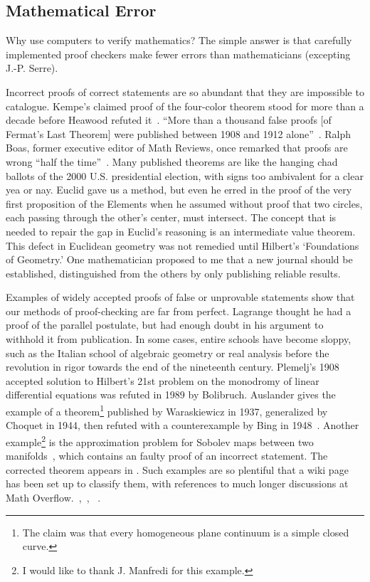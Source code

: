 \documentclass{llncs}
\begin{document}
\subsection{Mathematical Error}

Why use computers to verify mathematics?  The simple answer is that
carefully implemented proof checkers make fewer errors than 
mathematicians (excepting J.-P. Serre).

Incorrect proofs of correct statements are so abundant that they are
impossible to catalogue.  Kempe's claimed proof of the four-color
theorem stood for more than a decade before Heawood refuted
it~\cite[p.~115]{Mac}.  ``More than a thousand false proofs [of
Fermat's Last Theorem] were published between 1908 and 1912
alone''~\cite{Corry}.  Ralph Boas, former executive editor of Math
Reviews, once remarked that proofs are wrong ``half the
time''~\cite{Aus}.  Many published theorems are like the hanging chad
ballots of the 2000 U.S. presidential election, with signs too
ambivalent for a clear yea or nay.  Euclid gave us a method, but even
he erred in the proof of the very first proposition of the Elements
when he assumed without proof that two circles, each passing through
the other's center, must intersect.  The concept that is needed to
repair the gap in Euclid's reasoning is an intermediate value theorem.
This defect in Euclidean geometry was not remedied until Hilbert's
`Foundations of Geometry.'  One mathematician proposed to me that a
new journal should be established, distinguished from the others by
only publishing reliable results.


Examples of widely accepted proofs of false or unprovable statements
show that our methods of proof-checking are far from perfect.    Lagrange
thought he had a proof of the parallel postulate, but had enough doubt
in his argument to withhold it from publication.  In some cases,
entire schools have become sloppy, such as the Italian school of
algebraic geometry or real analysis before the revolution in rigor
towards the end of the nineteenth century.  Plemelj's 1908 accepted
solution to Hilbert's 21st problem on the monodromy of linear
differential equations was refuted in 1989 by Bolibruch.  Auslander
gives the example of a theorem\footnote{The claim was that every
  homogeneous plane continuum is a simple closed curve.}  published by
Waraskiewicz in 1937, generalized by Choquet in 1944, then refuted
with a counterexample by Bing in 1948~\cite{Aus}.  Another
example\footnote{I would like to thank J. Manfredi for this example.}
is the approximation problem for Sobolev maps between two
manifolds~\cite{Bethuel}, which contains an faulty proof of an
incorrect statement.  The corrected theorem appears in \cite{Hang}.
Such examples are so plentiful that a wiki
page has been set up to classify them, with references to much longer discussions
at Math Overflow.~\cite{XXWiki},~\cite{XXMO1}, ~\cite{XXMO2}.
\end{document}
